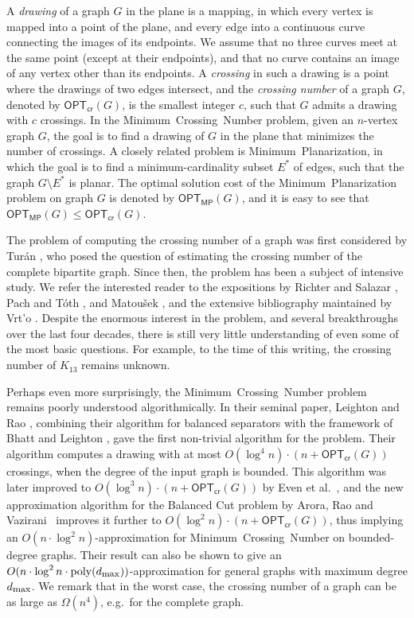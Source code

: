 \documentclass[twoside,leqno,twocolumn]{article}
\newcommand{\poly}{\operatorname{poly}}
\newcommand{\MP}{\mbox{\sf Minimum Planarization}\xspace}
\newcommand{\MCN}{\mbox{\sf Minimum Crossing Number}\xspace}
\newcommand{\optmp}[1]{\mathsf{OPT}_{\mathsf{MP}}(#1)}
\newcommand{\optcro}[1]{\mathsf{OPT}_{\mathsf{cr}}(#1)}
\newcommand{\dmax}{d_{\mbox{\textup{\footnotesize{max}}}}}
\begin{document}
A \emph{drawing} of a graph $G$ in the plane is a mapping, in which every vertex is mapped into a point of the plane, and every edge into a continuous curve connecting the images of its endpoints.
We assume that no three curves meet at the same point (except at their endpoints), and that no curve contains an image of any vertex other than its endpoints.
A \emph{crossing} in such a drawing is a point where the drawings of two edges intersect, and the \emph{crossing number} of a graph $G$, denoted by $\optcro{G}$, is the smallest integer $c$, such that $G$ admits a drawing with $c$ crossings.
In the \MCN problem, given an $n$-vertex graph $G$,  the goal is to find a drawing of $G$ in the plane that minimizes the number of crossings.
A closely related problem is \MP, in which the goal is to find a minimum-cardinality subset $E^*$ of edges, such that the graph $G\setminus E^*$ is planar. The optimal solution cost of the \MP problem on graph $G$ is denoted by $\optmp{G}$, and it is easy to see that $\optmp{G}\leq \optcro{G}$.


The problem of computing the crossing number of a graph was first considered by Tur\'{a}n \cite{turan_first}, who posed the question of estimating the crossing number of the complete bipartite graph.
Since then, the problem has been a subject of intensive study.
We refer the interested reader to the expositions by Richter and Salazar \cite{richter_survey}, Pach and T\'{o}th \cite{pach_survey}, and Matou\v{s}ek \cite{matousek_book}, and the extensive bibliography maintained by Vrt'o \cite{vrto_biblio}. Despite the enormous interest in the problem, and several breakthroughs over the last four decades, there is still very little understanding of even some of the most basic questions. For example, to the time of this writing, the crossing number of $K_{13}$ remains unknown.


Perhaps even more surprisingly, the \MCN problem remains poorly understood algorithmically.
In their seminal paper, Leighton and Rao \cite{LR}, combining their algorithm for balanced separators with the framework of Bhatt and Leighton \cite{bhatt84}, gave the first non-trivial algorithm for the problem. Their algorithm computes a drawing with at most $O(\log^4 n) \cdot (n + \optcro{G})$ crossings, when the degree of the input graph is bounded.
This algorithm was later improved to $O(\log^3 n) \cdot (n+\optcro{G})$ by Even et al.~\cite{EvenGS02}, and the new approximation algorithm for the Balanced Cut problem by Arora, Rao and Vazirani~\cite{ARV} improves it further to $O(\log^2 n) \cdot (n+\optcro{G})$, thus implying an $O(n \cdot \log^2 n)$-approximation for \MCN on bounded-degree graphs. Their result can also be shown to give an $O(n\cdot\log^2n\cdot \poly(\dmax))$-approximation for general graphs with maximum degree $\dmax$. We remark that in the worst case, the crossing number of a graph can be as large as $\Omega(n^4)$, e.g.~for the complete graph.
\end{document}
